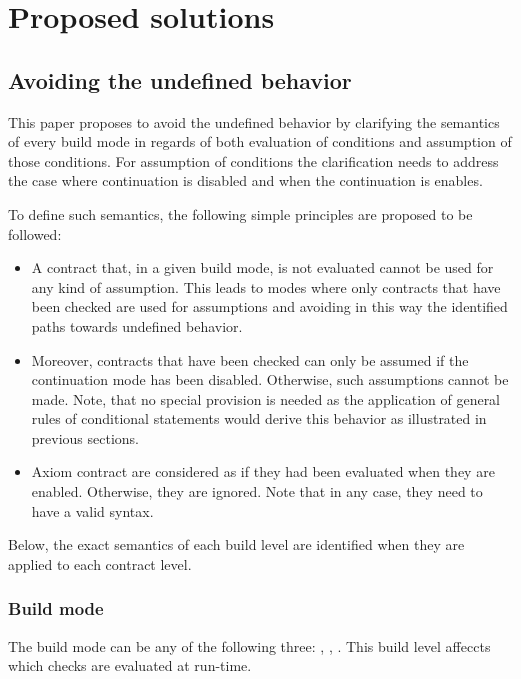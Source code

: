 \section{Proposed solutions}
\label{sec:proposed}

\subsection{Avoiding the undefined behavior}

This paper proposes to avoid the undefined behavior by clarifying the semantics of every
build mode in regards of both evaluation of conditions and assumption of those
conditions. For assumption of conditions the clarification needs to address the
case where continuation is disabled and when the continuation is enables.

To define such semantics, the following simple principles are proposed to be followed:

\begin{itemize}

\item A contract that, in a given build mode, is not evaluated cannot be used
for any kind of assumption. This leads to modes where only contracts that have
been checked are used for assumptions and avoiding in this way the identified
paths towards undefined behavior.

\item Moreover, contracts that have been checked can only be assumed if the
continuation mode has been disabled. Otherwise, such assumptions cannot be made.
Note, that no special provision is needed as the application of general rules
of conditional statements would derive this behavior as illustrated in previous
sections.

\item Axiom contract are considered as if they had been evaluated 
when they are enabled. Otherwise, they are ignored.
Note that in any case, they need to have a valid syntax.

\end{itemize}

Below, the exact semantics of each build level are identified when 
they are applied
to each contract level.

\subsubsection{Build mode}

The build mode can be any of the following three: , , 
. This build level affeccts which checks are evaluated at run-time.

